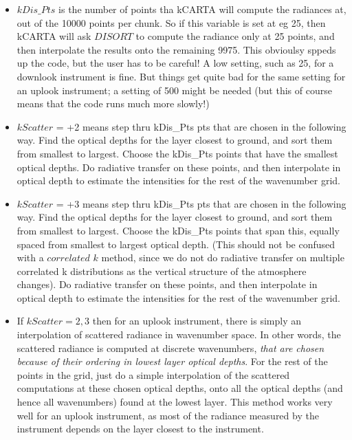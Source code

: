 \documentclass[12pt]{article}
\newcommand{\kc}{\textsf{kCARTA}\xspace}
\begin{document}
{{\begin{itemize}
\item $kDis\_Pts$ is the number of points tha \kc will compute the radiances 
at, out of the 10000 points per chunk. So if this variable is set at eg 25,
then \kc will ask $DISORT$ to compute the radiance only at 25 points, and then
interpolate the results onto the remaining 9975. This obvioulsy sppeds up 
the code, but the user has to be careful! A low setting, such as 25, for a 
downlook instrument is fine. But things get quite bad for the same setting
for an uplook instrument; a setting of 500 might be needed (but this of course
means that the code runs much more slowly!)

\item $kScatter$ = +2 means step thru kDis\_Pts pts that are chosen in the 
following way. Find the optical depths for the layer closest to ground, and 
sort them from smallest to largest. Choose the kDis\_Pts points that have the 
smallest optical depths. Do radiative transfer on these points, and then 
interpolate in optical depth to estimate the intensities for the rest of the 
wavenumber grid. 

\item $kScatter$ = +3 means step thru kDis\_Pts pts that are chosen in the 
following way. Find the optical depths for the layer closest to ground, and 
sort them from smallest to largest. Choose the kDis\_Pts points that span 
this, equally spaced from smallest to largest optical depth. (This should not
be confused with a $correlated$ $k$ method, since we do not do radiative 
transfer on multiple correlated k distributions as the vertical structure of 
the atmosphere changes). Do radiative transfer on these points, and then 
interpolate in optical depth to estimate the intensities for the rest of 
the wavenumber grid. 

\item If $kScatter = 2,3$ then for an uplook instrument, there is simply an
interpolation of scattered radiance in wavenumber space. In other words, the
scattered radiance is computed at discrete wavenumbers, {\em that are chosen
because of their ordering in lowest layer optical depths}. For the rest
of the points in the grid, just do a simple interpolation of the
scattered computations at these chosen optical depths, onto all the optical
depths (and hence all wavenumbers) found at the lowest layer. This method works
very well for an uplook instrument, as most of the radiance measured by
the instrument depends on the layer closest to the instrument.


\end{itemize}}}
\end{document}
